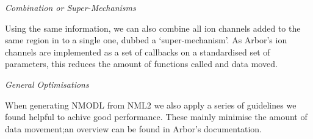 \documentclass{beamer}
\begin{document}
\begin{frame}[t, fragile]
\begin{columns}
\begin{column}{0.49\textwidth}
      \vspace*{1ex}
      \emph{Combination or Super-Mechanisms}

      Using the same information, we can also combine all ion channels added to
      the same region in to a single one, dubbed a `super-mechanism'. As Arbor's
      ion channels are implemented as a set of callbacks on a standardised set
      of parameters, this reduces the amount of functions called and data moved.

      \vspace*{1ex}
      \emph{General Optimisations}

      When generating NMODL from NML2 we also apply a series of guidelines we
      found helpful to achive good performance. These mainly minimise the amount
      of data movement;\@ an overview can be found in Arbor's documentation.
    \end{column}
  \end{columns}
\end{frame}
\end{document}
